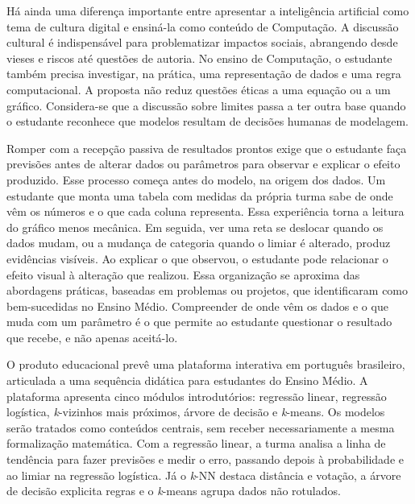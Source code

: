 Há ainda uma diferença importante entre apresentar a inteligência artificial como tema de cultura digital e ensiná-la como conteúdo de Computação. A discussão cultural é indispensável para problematizar impactos sociais, abrangendo desde vieses e riscos até questões de autoria. No ensino de Computação, o estudante também precisa investigar, na prática, uma representação de dados e uma regra computacional. A proposta não reduz questões éticas a uma equação ou a um gráfico. Considera-se que a discussão sobre limites passa a ter outra base quando o estudante reconhece que modelos resultam de decisões humanas de modelagem.

Romper com a recepção passiva de resultados prontos exige que o estudante faça previsões antes de alterar dados ou parâmetros para observar e explicar o efeito produzido. Esse processo começa antes do modelo, na origem dos dados. Um estudante que monta uma tabela com medidas da própria turma sabe de onde vêm os números e o que cada coluna representa. Essa experiência torna a leitura do gráfico menos mecânica. Em seguida, ver uma reta se deslocar quando os dados mudam, ou a mudança de categoria quando o limiar é alterado, produz evidências visíveis. Ao explicar o que observou, o estudante pode relacionar o efeito visual à alteração que realizou. Essa organização se aproxima das abordagens práticas, baseadas em problemas ou projetos, que  identificaram como bem-sucedidas no Ensino Médio. Compreender de onde vêm os dados e o que muda com um parâmetro é o que permite ao estudante questionar o resultado que recebe, e não apenas aceitá-lo.

O produto educacional prevê uma plataforma interativa em português brasileiro, articulada a uma sequência didática para estudantes do Ensino Médio. A plataforma apresenta cinco módulos introdutórios: regressão linear, regressão logística, \textit{k}-vizinhos mais próximos, árvore de decisão e \textit{k}-means. Os modelos serão tratados como conteúdos centrais, sem receber necessariamente a mesma formalização matemática. Com a regressão linear, a turma analisa a linha de tendência para fazer previsões e medir o erro, passando depois à probabilidade e ao limiar na regressão logística. Já o \textit{k}-NN destaca distância e votação, a árvore de decisão explicita regras e o \textit{k}-means agrupa dados não rotulados.

